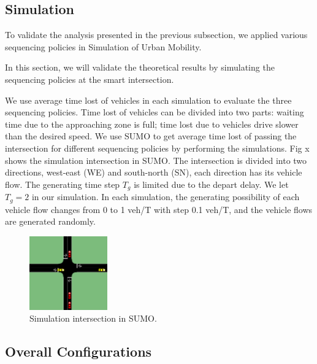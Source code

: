 \documentclass{article}
\begin{document}
\subsection{Simulation}

To validate the analysis presented in the previous subsection, we applied various sequencing policies in Simulation of Urban Mobility.  %

In this section, we will validate the theoretical results by simulating the sequencing policies at the smart intersection. 

We use average time lost of vehicles in each simulation to evaluate the three sequencing policies. Time lost of vehicles can be divided into two parts: waiting time due to the approaching zone is full; time lost due to vehicles drive slower than the desired speed. We use SUMO to get average time lost of passing the intersection for different sequencing policies by performing the simulations. Fig x shows the simulation intersection in SUMO. The intersection is divided into two directions, west-east (WE) and south-north (SN), each direction has its vehicle flow. The generating time step $T_g$ is limited due to the depart delay. We let $T_g=2$ in our simulation. In each simulation, the generating possibility of each vehicle flow changes from 0 to 1 veh/T with step 0.1 veh/T, and the vehicle flows are generated randomly. 


\begin{figure}[H]
  \centering
  \includegraphics[width=0.3\textwidth]{intersection_SUMO.png}
  \caption{Simulation intersection in SUMO.}
  \label{fig:simulation_SUMO}
\end{figure}


\subsection{Overall Configurations}
\end{document}
